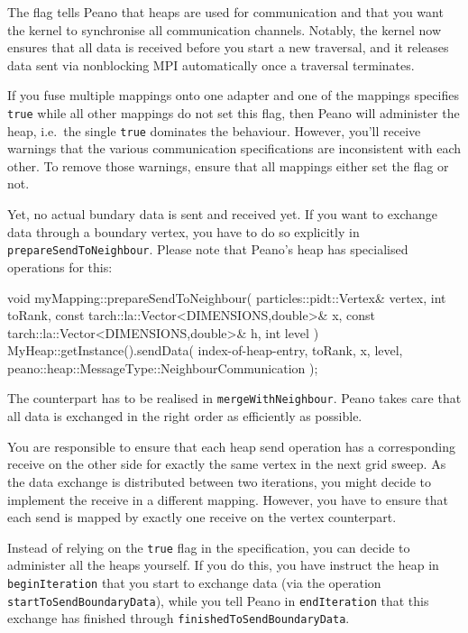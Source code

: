 \noindent
The flag tells Peano that heaps are used for communication and that you want the
kernel to synchronise all communication channels. 
Notably, the kernel now ensures that all data is received before you start a new
traversal, and it releases data sent via nonblocking MPI automatically once a
traversal terminates.

\begin{remark}
If you fuse multiple mappings onto one adapter and one of the mappings specifies
\texttt{true} while all other mappings do not set this flag, then Peano will
administer the heap, i.e.~the single \texttt{true} dominates the behaviour.
However, you'll receive warnings that the various communication specifications
are inconsistent with each other. To remove those warnings, ensure that all
mappings either set the flag or not.
\end{remark}


Yet, no actual bundary data is sent and received yet. 
If you want to exchange data through a boundary vertex, you have to do so
explicitly in \texttt{prepareSendToNeighbour}.
Please note that Peano's heap has specialised operations for this:
\begin{code}
void myMapping::prepareSendToNeighbour(
  particles::pidt::Vertex&                      vertex,
  int                                           toRank,
  const tarch::la::Vector<DIMENSIONS,double>&   x,
  const tarch::la::Vector<DIMENSIONS,double>&   h,
  int                                           level
) {
  MyHeap::getInstance().sendData(
    index-of-heap-entry,
    toRank,
    x,
    level,
    peano::heap::MessageType::NeighbourCommunication
  );
}
\end{code}

\noindent
The counterpart has to be realised in \texttt{mergeWithNeighbour}.
Peano takes care that all data is exchanged in the right order as efficiently as
possible.

\begin{remark}
You are responsible to ensure that each heap send operation has a
corresponding receive on the other side for exactly the same vertex in the next
grid sweep.
As the data exchange is distributed between two iterations, you might decide to
implement the receive in a different mapping.
However, you have to ensure that each send is mapped by exactly one receive on
the vertex counterpart.
\end{remark}

\noindent
Instead of relying on the \texttt{true} flag in the specification, you can
decide to administer all the heaps yourself. 
If you do this, you have instruct the heap in \texttt{beginIteration} that you
start to exchange data (via the operation \texttt{startToSendBoundaryData}),
while you tell Peano in \texttt{endIteration} that this exchange has finished
through \texttt{finishedToSendBoundaryData}.


